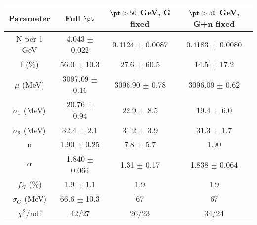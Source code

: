 \begin{tabular}{c||c|c|c}
Parameter & Full $\pt$ & $\pt>50$ GeV, G fixed & $\pt>50$ GeV, G+n fixed \\
\hline
N per 1 GeV & 4.043 $\pm$ 0.022 & 0.4124 $\pm$ 0.0087 & 0.4183 $\pm$ 0.0080\\
f (\%) & 56.0 $\pm$ 10.3 & 27.6 $\pm$ 60.5 & 14.5 $\pm$ 17.2\\
$\mu$ (MeV) & 3097.09 $\pm$ 0.16 & 3096.90 $\pm$ 0.78 & 3096.09 $\pm$ 0.62\\
$\sigma_1$ (MeV) & 20.76 $\pm$ 0.94 & 22.9 $\pm$ 8.5 & 19.4 $\pm$ 6.0\\
$\sigma_2$ (MeV) & 32.4 $\pm$ 2.1 & 31.2 $\pm$ 3.9 & 31.3 $\pm$ 1.7\\
n & 1.90 $\pm$ 0.25 & 7.8 $\pm$ 5.7 & 1.90\\
$\alpha$ & 1.840 $\pm$ 0.066 & 1.31 $\pm$ 0.17 & 1.838 $\pm$ 0.064\\
$f_G$ (\%) & 1.9 $\pm$ 1.1 & 1.9 & 1.9\\
$\sigma_G$ (MeV) & 66.6 $\pm$ 10.3 & 67 & 67\\
\hline
$\chi^2$/ndf & 42/27 & 26/23 & 34/24\\
\end{tabular}
